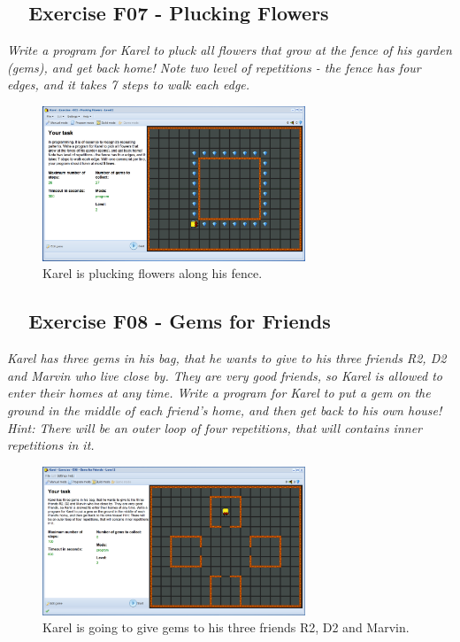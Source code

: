 \documentclass[article,A4,12pt]{llncs}
\begin{document}
\subsection{\ \ Exercise F07 - Plucking Flowers}

{\em Write a program for Karel to pluck all flowers that grow at the fence of his garden (gems), and get back home! Note two level of repetitions - the fence has four edges, and it takes 7 steps to walk each edge.}


\begin{figure}[!ht]
\begin{center}
\includegraphics[width=0.7\textwidth]{img/g02.png}
\end{center}
\vspace{-4mm}
\caption{Karel is plucking flowers along his fence.}
\label{fig:g02}
\vspace{-4mm}
\end{figure}
\noindent

\subsection{\ \ Exercise F08 - Gems for Friends}

{\em Karel has three gems in his bag, that he wants to give to his three friends R2, D2 and Marvin who live close by. They are very good friends, so Karel is allowed to enter their homes at any time. Write a program for Karel to put a gem on the ground in the middle of each friend's home, and then get back to his own house! Hint: There will be an outer loop of four repetitions, that will contains inner repetitions in it.}


\begin{figure}[!ht]
\begin{center}
\includegraphics[width=0.7\textwidth]{img/g03.png}
\end{center}
\vspace{-4mm}
\caption{Karel is going to give gems to his three friends R2, D2 and Marvin.}
\label{fig:g03}
\vspace{-4mm}
\end{figure}
\noindent
\end{document}
